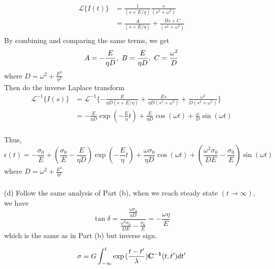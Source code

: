 \begin{align*}
    \mathcal{L}\{I(t)\}&=\frac1{(s+E/\eta)}\frac s{(s^2+\omega^2)} \\
    &= \frac{A}{(s+E/\eta)}+\frac {Bs+C}{(s^2+\omega^2)} \\
\end{align*}
By combining and comparing the same terms, we get
\begin{equation*}
    A= -\frac{E}{\eta D},\ B=\frac{E}{\eta D},\ C= \frac{\omega^2}{D} \\ 
\end{equation*}
where $D=\omega^2+\frac{E^2}{\eta^2}$\\
Then do the inverse Laplace transform
\begin{align*}
    \mathcal{L}^{-1}\{I(s)\}&=\mathcal{L}^{-1}\{-\frac{E}{\eta D(s+E/\eta)}+\frac{Es}{\eta D(s^2+\omega^2)}+\frac{\omega^2}{D(s^2+\omega^2)} \} \\
    &=-\frac{E}{\eta D}\exp{(-\frac E\eta t)}+\frac{E}{\eta D}\cos{(\omega t)}+\frac{\omega}{D}\sin{(\omega t)}
\end{align*}
\\
Thus, 
\begin{equation*}
    \epsilon(t) = -\frac{\sigma_0}E+(\frac{\sigma_0}{E}-\frac{E}{\eta D})\exp{(-\frac E\eta t)}+\frac{\omega \sigma_0}{\eta D}\cos{(\omega t)}+(\frac{\omega^2\sigma_0}{DE}-\frac{\sigma_0}E)\sin{(\omega t)}
\end{equation*}
where $D=\omega^2+\frac{E^2}{\eta^2}$\\
\\
(d) Follow the same analysis of Part (b), when we reach steady state $(t \rightarrow\infty)$, we have
\begin{equation*}
    \tan \delta = \frac{\frac{\omega \sigma_0}{\eta D}}{\frac{\omega^2\sigma_0}{DE}-\frac{\sigma_0}E}=-\frac{\omega \eta}{E}
\end{equation*}
which is the same as in Part (b) but inverse sign.

\begin{equation}
    \sigma=G\int^t_{-\infty}\exp{(\frac{t-t'}{\lambda})}\mathbf{C^{-1}}(t,t')dt'
\end{equation}